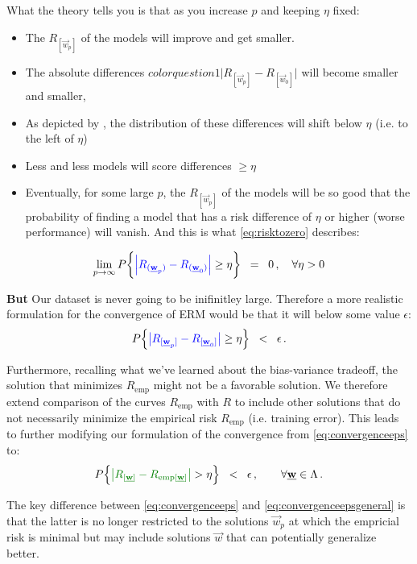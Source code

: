 \begin{frame}
{\begin{itemize}
			What the theory tells you is that as you increase $p$ and keeping $\eta$ fixed:
			\begin{itemize}
				\item The $R_{[\vec w_p]}$ of the models will improve and get smaller.
				\item The absolute differences ${color{question1}\Big|R_{[\vec w_p]} - R_{[\vec w_0]}\Big|}$ will become smaller and smaller,
				\item As depicted by , the distribution of these differences will shift below $\eta$ (i.e. to the left of $\eta$)
				\item Less and less models will score differences $\ge \eta$
				\item Eventually, for some large $p$, the $R_{[\vec w_p]}$ of the models will be so good that the probability of finding a model that has a risk difference of $\eta$ or higher (worse performance) will vanish. And this is what \eqref{eq:risktozero} describes:
			\end{itemize}
			\end{itemize}
			\begin{equation}
				\lim_{p \to \infty} P\bigg\{ 
					{\color{question1}
						\Big|R_{(\vec w_p)} - R_{(\vec w_0)}\Big| 
					}
				\geq \eta \bigg\}\;\;=\;\; 0 \,, \quad \forall \eta > 0
				\label{eq:risktozero}
			\end{equation}
			
			\textbf{But} Our dataset is never going to be inifinitley large. Therefore a more realistic formulation for the convergence of ERM would be that it will below some value $\epsilon$:
			\begin{equation}
					P \Big\{ {\color{question1} 
							\big| R_{[\vec{w}_p]} - R_{[\vec{w}_0]} \big| 
						} \geq \eta \Big\} \;\;<\;\; \epsilon \,.
						\label{eq:convergenceeps}
				\end{equation}
				
			Furthermore, recalling what we've learned about the bias-variance tradeoff, the solution that minimizes $R_{\text{emp}}$ might not be a favorable solution. We therefore extend comparison of the curves $R_{\text{emp}}$ with $R$ to include other solutions that do not necessarily minimize the empirical risk $R_{\text{emp}}$ (i.e. training error). This leads to further modifying our formulation of the convergence from \eqref{eq:convergenceeps} to:
				\begin{equation}
					P \Big\{ {\color{question2}
							\big| R_{[\vec w]} - R_{\mathrm{emp}[\vec w]} \big|
						} > \eta \Big\} \;\;<\;\; \epsilon \,, 
						\qquad \forall \vec w \in \Lambda \,.
						\label{eq:convergenceepsgeneral}
				\end{equation}
			
			The key difference between \eqref{eq:convergenceeps} and \eqref{eq:convergenceepsgeneral} is that the latter is no longer restricted to the solutions $\vec w_p$ at which the empricial risk is minimal but may include solutions $\vec w$ that can potentially generalize better.
}
\end{frame}
